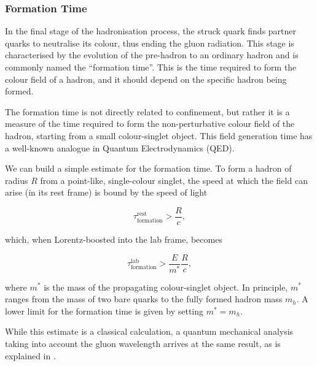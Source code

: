 \subsubsection{Formation Time}
\label{10.33::formation_time}
    In the final stage of the hadronisation process, the struck quark finds partner quarks to neutralise its colour, thus ending the gluon radiation.
    This stage is characterised by the evolution of the pre-hadron to an ordinary hadron and is commonly named the ``formation time''.
    This is the time required to form the colour field of a hadron, and it should depend on the specific hadron being formed.

    The formation time is not directly related to confinement, but rather it is a measure of the time required to form the non-perturbative colour field of the hadron, starting from a small colour-singlet object.
    This field generation time has a well-known analogue in Quantum Electrodynamics (QED).

    We can build a simple estimate for the formation time.
    To form a hadron of radius $R$ from a point-like, single-colour singlet, the speed at which the field can arise (in its rest frame) is bound by the speed of light

    \begin{equation*}
        \tau^\text{rest}_\text{formation} > \frac{R}{c},
    \end{equation*}

    which, when Lorentz-boosted into the lab frame, becomes

    \begin{equation*}
        \tau^\text{lab}_\text{formation} > \frac{E}{m^*} \frac{R}{c},
    \end{equation*}

    where $m^*$ is the mass of the propagating colour-singlet object.
    In principle, $m^*$ ranges from the mass of two bare quarks to the fully formed hadron mass $m_h$.
    A lower limit for the formation time is given by setting $m^* = m_h$.

    While this estimate is a classical calculation, a quantum mechanical analysis taking into account the gluon wavelength arrives at the same result, as is explained in \cite{dokshitzer1991}.

